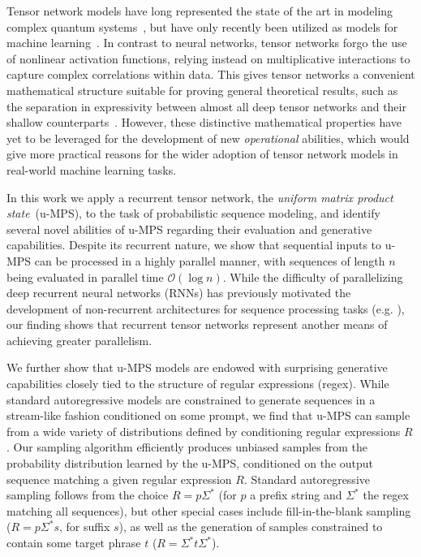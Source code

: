 \documentclass[twoside]{article}
\newcommand{\bigO}{\mc{O}}
\newcommand{\mc}[1]{\mathcal{#1}}
\begin{document}
Tensor network models have long represented the state of the art in modeling complex quantum systems~\citep{white1992, fannes1992, orus2019}, but have only recently been utilized as models for machine learning~\citep{novikov2015, cohen2016, stoudenmire2016, novikov2017, han2018, stoudenmire2018, cheng2019}. In contrast to neural networks, tensor networks forgo the use of nonlinear activation functions, relying instead on multiplicative interactions to capture complex correlations within data. This gives tensor networks a convenient mathematical structure suitable for proving general theoretical results, such as the separation in expressivity between almost all deep tensor networks and their shallow counterparts~\citep{cohen2016}. However, these distinctive mathematical properties have yet to be leveraged for the development of new \emph{operational} abilities, which would 
give more practical reasons for the wider adoption of tensor network models in real-world machine learning tasks.
 
In this work we apply a recurrent tensor network, the \emph{uniform matrix product state}~(u-MPS), to the task of probabilistic sequence modeling, and identify several novel abilities of u-MPS regarding their evaluation and generative capabilities. Despite its recurrent nature, we show that sequential inputs to u-MPS can be processed in a highly parallel manner, with sequences of length $n$ being evaluated in parallel time $\bigO(\log n)$. While the difficulty of parallelizing deep recurrent neural networks (RNNs) has previously motivated the development of non-recurrent architectures for sequence processing tasks (e.g. \citep{gehring2017, vaswani2017}), our finding shows that recurrent tensor networks represent another means of achieving greater parallelism.

We further show that u-MPS models are endowed with surprising generative capabilities closely tied to the structure of regular expressions (regex). While standard autoregressive models are constrained to generate sequences in a stream-like fashion conditioned on some prompt, we find that u-MPS can sample from a wide variety of distributions defined by conditioning regular expressions $R$. Our sampling algorithm efficiently produces unbiased samples from the probability distribution learned by the u-MPS, conditioned on the output sequence matching a given regular expression $R$. Standard autoregressive sampling follows from the choice $R = p\Sigma^*$ (for $p$ a prefix string and $\Sigma^*$ the regex matching all sequences), but other special cases include fill-in-the-blank sampling ($R = p\Sigma^*s$, for suffix $s$), as well as the generation of samples constrained to contain some target phrase $t$ ($R=\Sigma^*t\Sigma^*$).
\end{document}
